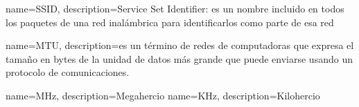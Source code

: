 


{
name=SSID,
description={Service Set Identifier: es un nombre incluido en todos los paquetes de una red inalámbrica para identificarlos como parte de esa red}
}

{
name=MTU,
description={es un término de redes de computadoras que expresa el tamaño en bytes de la unidad de datos más grande que puede enviarse usando un protocolo de comunicaciones.}
}

{
name=MHz,
description={Megahercio}
}
{
name=KHz,
description={Kilohercio}
}
